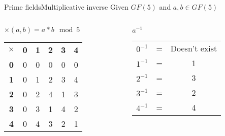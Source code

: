 \begin{frame}[t]{Prime fields}{Multiplicative inverse}
	Given $GF(5)$ and $a, b \in GF(5)$
	\medskip
	
	\begin{columns}
		\begin{column}{0.5\textwidth}
			\centering $\times(a, b) = a * b \mod 5$		
			\begin{table}[]
				\begin{tabular}{cccccc}
					\textbf{$\times$} & \textbf{0} & \textbf{1} & \textbf{2} & \textbf{3} & \textbf{4} \\
					\textbf{0} & 0          & 0          & 0          & 0          & 0          \\
					\textbf{1} & 0          & 1          & 2          & 3          & 4          \\
					\textbf{2} & 0          & 2          & 4          & 1          & 3          \\
					\textbf{3} & 0          & 3          & 1          & 4          & 2          \\
					\textbf{4} & 0          & 4          & 3          & 2          & 1         
				\end{tabular}
			\end{table}
		\end{column}
		\begin{column}{0.5\textwidth}  %
			\centering $a^{-1}$		
			\begin{table}[]
				\begin{tabular}{ccc}
					$0^{-1}$  & = & Doesn't exist \\
					$1^{-1}$  & = & 1 \\
					$2^{-1}$  & = & 3 \\
					$3^{-1}$  & = & 2 \\
					$4^{-1}$  & = & 4
				\end{tabular}
			\end{table}
		\end{column}
	\end{columns}
\end{frame}

